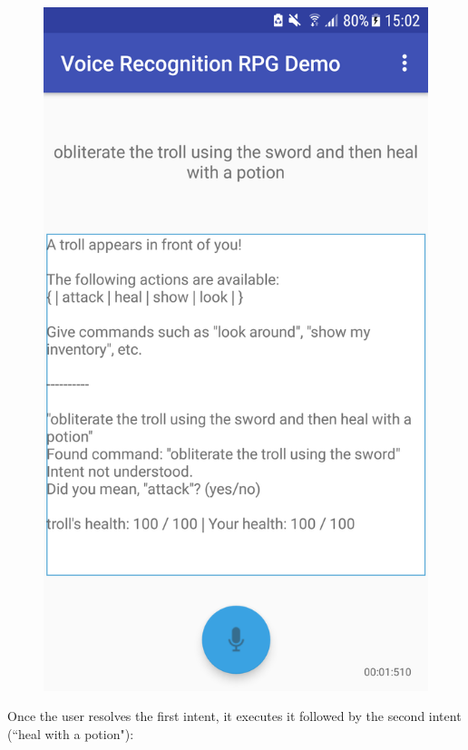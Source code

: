 \documentclass[11pt]{article}
\begin{document}
\begin{appendices}
\begin{center}
\begin{figure}[H]
\begin{center}
  \includegraphics[scale=0.25]{Screenshot_20180527-150212.png}
  \label{fig:snapshot-multiple-command-1}
  \end{center}
\end{figure}
\end{center}

\newpage
Once the user resolves the first intent, it executes it followed by the second intent (``heal with a potion"):


\end{appendices}
\end{document}
